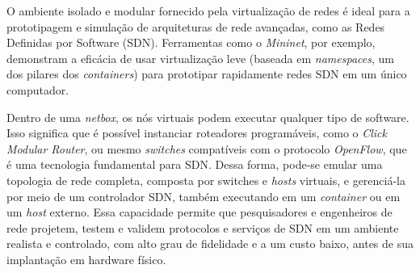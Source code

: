 O ambiente isolado e modular fornecido pela virtualização de redes é ideal para a prototipagem e simulação de arquiteturas de rede avançadas, como as Redes Definidas por Software (SDN). Ferramentas como o \textit{Mininet}, por exemplo, demonstram a eficácia de usar virtualização leve (baseada em \textit{namespaces}, um dos pilares dos \textit{containers}) para prototipar rapidamente redes SDN em um único computador.

Dentro de uma \textit{netbox}, os nós virtuais podem executar qualquer tipo de software. Isso significa que é possível instanciar roteadores programáveis, como o \textit{Click Modular Router}, ou mesmo \textit{switches} compatíveis com o protocolo \textit{OpenFlow}, que é uma tecnologia fundamental para SDN. Dessa forma, pode-se emular uma topologia de rede completa, composta por switches e \textit{hosts} virtuais, e gerenciá-la por meio de um controlador SDN, também executando em um \textit{container} ou em um \textit{host} externo. Essa capacidade permite que pesquisadores e engenheiros de rede projetem, testem e validem protocolos e serviços de SDN em um ambiente realista e controlado, com alto grau de fidelidade e a um custo baixo, antes de sua implantação em hardware físico.



